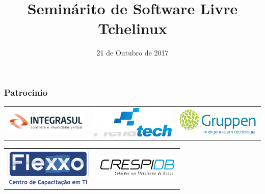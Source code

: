 

\def\alimentos{000}
\def\participantes{000}
\def\caridade{CAPS Joana D'Arc}
\def\palestrantes{Treze}
\def\palestras{Dezesseis}

\title{Seminárito de Software Livre Tchelinux}
\author{}
\date{21 de Outubro de 2017}




\coverframe

\begin{frame}
    \frametitle{Patrocinio}
   
\begin{center}
\begin{tabular}[h]{ccc}
\includegraphics[width=4.2cm]{images/integrasul.png} &
\includegraphics[width=4.2cm]{images/plenatech.png} &
\includegraphics[width=4.2cm]{images/gruppen.png}
\end{tabular}
\vfill
\begin{tabular}[h]{cc}
\includegraphics[width=4.2cm]{images/flexxo.png} &
\includegraphics[width=4.2cm]{images/crespidb.png}
\end{tabular}
\end{center}
\end{frame}

